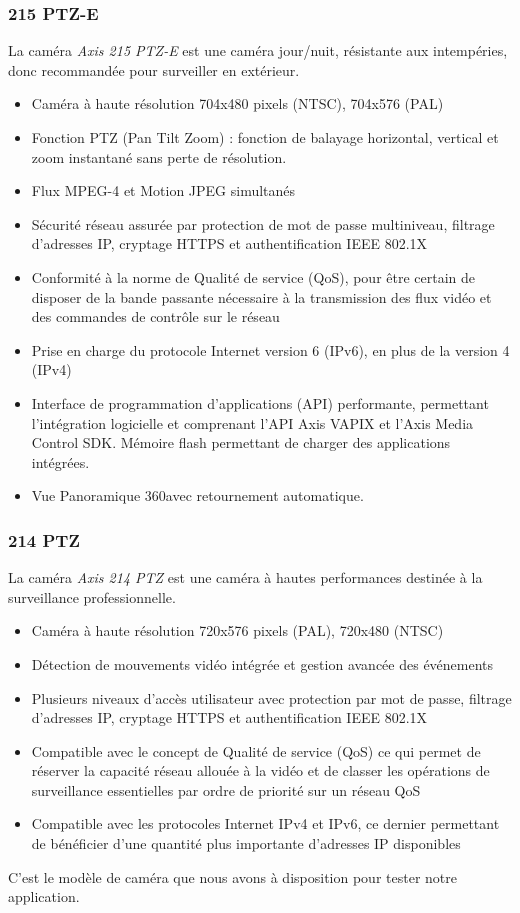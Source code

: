 \subsubsection{215 PTZ-E}
La caméra \textit{Axis 215 PTZ-E} est une caméra jour/nuit, résistante aux
intempéries, donc recommandée pour surveiller en extérieur.
\begin{itemize}
  \item Caméra à haute résolution 704x480 pixels (NTSC), 704x576 (PAL)
  \item Fonction PTZ (Pan Tilt Zoom) : fonction de balayage horizontal, vertical
  et zoom instantané sans perte de résolution. 
  \item Flux MPEG-4 et Motion JPEG simultanés
  \item Sécurité réseau assurée par protection de mot de passe multiniveau,
  filtrage d’adresses IP, cryptage HTTPS et authentification IEEE 802.1X
  \item Conformité à la norme de Qualité de service (QoS), pour être certain de
  disposer de la bande passante nécessaire à la transmission des flux vidéo et
  des commandes de contrôle sur le réseau
  \item Prise en charge du protocole Internet version 6 (IPv6), en plus de la version 4 (IPv4)
  \item Interface de programmation d’applications (API) performante, permettant
  l’intégration logicielle et comprenant l’API Axis VAPIX et l’Axis Media
  Control SDK. Mémoire flash permettant de charger des applications intégrées.
  \item Vue Panoramique 360\degre avec retournement automatique.
\end{itemize}
\subsubsection{214 PTZ}
La caméra \textit{Axis 214 PTZ} est une caméra à hautes performances destinée à
la surveillance professionnelle.
\begin{itemize}
  \item Caméra à haute résolution 720x576 pixels (PAL), 720x480 (NTSC)
  \item Détection de mouvements vidéo intégrée et gestion avancée des événements
  \item Plusieurs niveaux d’accès utilisateur avec protection par mot de passe,
  filtrage d’adresses IP, cryptage HTTPS et authentification IEEE 802.1X
  \item Compatible avec le concept de Qualité de service (QoS) ce qui permet de
  réserver la capacité réseau allouée à la vidéo et de classer les opérations de
  surveillance essentielles par ordre de priorité sur un réseau QoS
  \item Compatible avec les protocoles Internet IPv4 et IPv6, ce dernier permettant
  de bénéficier d’une quantité plus importante d’adresses IP disponibles
\end{itemize}
C'est le modèle de caméra que nous avons à disposition pour tester notre
application.
